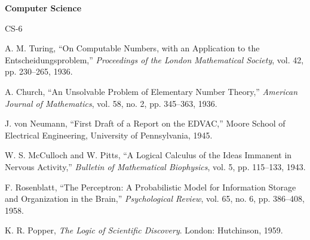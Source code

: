 \documentclass[12pt, a4paper]{article}
\begin{document}
\vspace{1em}
{\noindent\bfseries Computer Science}\par\smallskip
\begin{thebibliography}{CS-6}

 A. M. Turing, ``On Computable Numbers, with an Application to the
    Entscheidungsproblem,'' \textit{Proceedings of the London Mathematical Society}, vol. 42,
    pp. 230--265, 1936.

 A. Church, ``An Unsolvable Problem of Elementary Number Theory,''
    \textit{American Journal of Mathematics}, vol. 58, no. 2, pp. 345--363, 1936.

 J. von Neumann, ``First Draft of a Report on the EDVAC,'' Moore School of
    Electrical Engineering, University of Pennsylvania, 1945.

 W. S. McCulloch and W. Pitts, ``A Logical Calculus of the Ideas Immanent in
    Nervous Activity,'' \textit{Bulletin of Mathematical Biophysics}, vol. 5, pp. 115--133, 1943.

 F. Rosenblatt, ``The Perceptron: A Probabilistic Model for Information
    Storage and Organization in the Brain,'' \textit{Psychological Review}, vol. 65, no. 6,
    pp. 386--408, 1958.

 K. R. Popper, \textit{The Logic of Scientific Discovery}. London:
    Hutchinson, 1959.

\end{thebibliography}
\end{document}
